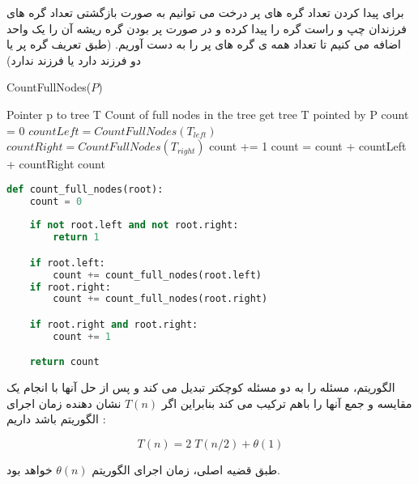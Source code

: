 \documentclass[]{article}
\begin{document}
برای پیدا کردن تعداد گره های پر درخت می توانیم به صورت بازگشتی تعداد گره های فرزندان
چپ و راست گره را پیدا کرده و در صورت پر بودن گره ریشه آن را یک واحد اضافه می کنیم تا
تعداد همه ی گره های پر را به دست آوریم. (طبق تعریف گره پر یا دو فرزند دارد یا فرزند ندارد)
\begin{latin}
    \begin{algorithm}[H]
        \caption*{CountFullNodes($P$)}
        \begin{algorithmic}
            \Require Pointer p to tree T
            \Ensure Count of full nodes in the tree
            \State get tree T pointed by P
            \State count = 0
                \State {}
            \Else
                \State $countLeft = CountFullNodes(T_{left})$
                \State $countRight = CountFullNodes(T_{right})$
                \State count += 1
                \EndIf
                \State count = count + countLeft + countRight
                \State \Return count
            \EndIf
        \end{algorithmic}
    \end{algorithm}
\end{latin}
\begin{latin}
\begin{lstlisting}[language=Python, caption=Python Implementation]
def count_full_nodes(root):
    count = 0
    
    if not root.left and not root.right:
        return 1

    if root.left:
        count += count_full_nodes(root.left)
    if root.right:
        count += count_full_nodes(root.right)

    if root.right and root.right:
        count += 1

    return count
\end{lstlisting}
\end{latin}
الگوریتم، مسئله را به دو مسئله کوچکتر تبدیل می کند و پس از حل آنها با انجام یک مقایسه و جمع
آنها را باهم ترکیب می کند بنابراین اگر $T(n)$ نشان دهنده زمان اجرای الگوریتم باشد داریم :

$$T(n) = 2\;T(n/2) + \theta(1)$$

طبق قضیه اصلی، زمان اجرای الگوریتم $\theta(n)$ خواهد بود.
\end{document}
